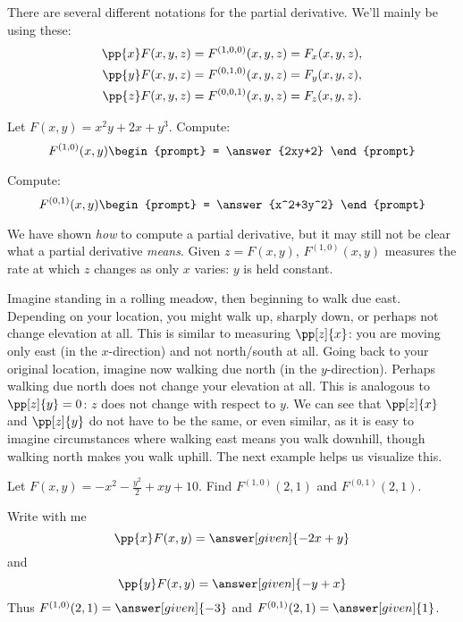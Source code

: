 \documentclass{ximera}
\begin{document}
\begin{definition}
  There are several different notations for the partial derivative.
  We'll mainly be using these:
  \begin{align*}
    \pp{x} F(x,y,z) &= F^{(1,0,0)}(x,y,z) = F_x(x,y,z),\\
    \pp{y} F(x,y,z) &= F^{(0,1,0)}(x,y,z) = F_y(x,y,z),\\
    \pp{z} F(x,y,z) &= F^{(0,0,1)}(x,y,z) = F_z(x,y,z).
  \end{align*}
\end{definition}

\begin{question}
  Let $F(x,y) = x^2y + 2x+y^3$. Compute:
  \[
  F^{(1,0)}(x,y)
  \begin{prompt}
    = \answer{2xy+2}
  \end{prompt}
  \]
  \begin{question}
    Compute:
  \[
  F^{(0,1)}(x,y)
  \begin{prompt}
    = \answer{x^2+3y^2}
  \end{prompt}
  \]
  \end{question}
\end{question}

We have shown \textit{how} to compute a partial derivative, but it may
still not be clear what a partial derivative \textit{means}. Given
$z=F(x,y)$, $F^{(1,0)}(x,y)$ measures the rate at which $z$ changes as
only $x$ varies: $y$ is held constant. 

Imagine standing in a rolling meadow, then beginning to walk due
east. Depending on your location, you might walk up, sharply down, or
perhaps not change elevation at all. This is similar to measuring
$\pp[z]{x}$: you are moving only east (in the $x$-direction) and
not north/south at all. Going back to your original location, imagine
now walking due north (in the $y$-direction). Perhaps walking due
north does not change your elevation at all. This is analogous to
$\pp[z]{y}=0$: $z$ does not change with respect to $y$. We can see
that $\pp[z]{x}$ and $\pp[z]{y}$ do not have to be the same, or even
similar, as it is easy to imagine circumstances where walking east
means you walk downhill, though walking north makes you walk uphill.
The next example helps us visualize this.


\begin{example}
  Let $F(x,y)=-x^2-\frac{y^2}{2}+xy+10$. Find $F^{(1,0)}(2,1)$ and
  $F^{(0,1)}(2,1)$.
  \begin{explanation}
    Write with me
    \[
    \pp{x}F(x,y) = \answer[given]{-2x+y}
    \]
    and
    \[
    \pp{y}F(x,y) = \answer[given]{-y+x}
    \]
    Thus $F^{(1,0)}(2,1) = \answer[given]{-3}$ and $F^{(0,1)}(2,1) =
    \answer[given]{1}$.
  \end{explanation}
\end{example}
\end{document}
